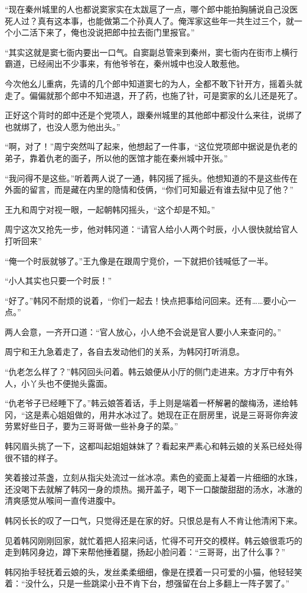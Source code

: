 “现在秦州城里的人也都说窦家实在太跋扈了一点，哪个郎中能拍胸脯说自己没医死人过？真有这本事，也能做第二个孙真人了。俺浑家这些年一共生过三个，就一个小二活下来了，俺也没说把郎中拉去衙门里报官。”

“其实这就是窦七衙内要出一口气。自窦副总管来到秦州，窦七衙内在街市上横行霸道，已经闹出不少事来，有他爷爷在，秦州城中也没人敢惹他。

今次他幺儿重病，先请的几个郎中知道窦七的为人，全都不敢下针开方，摇着头就走了。偏偏就那个郎中不知进退，开了药，也施了针，可是窦家的幺儿还是死了。

正好这个背时的郎中还是个党项人，跟秦州城里的其他郎中都没什么来往，说绑了也就绑了，也没人愿为他出头。”

“啊，对了！”周宁突然叫了起来，他想起了一件事，“这位党项郎中据说是仇老的弟子，靠着仇老的面子，所以他的医馆才能在秦州城中开张。”

“我问得不是这些。”听着两人说了一通，韩冈摇了摇头。他想知道的不是这些传在外面的留言，而是藏在内里的隐情和伎俩，“你们可知最近有谁去狱中见了他？”

王九和周宁对视一眼，一起朝韩冈摇头，“这个却是不知。”

周宁这次又抢先一步，他对韩冈道：“请官人给小人两个时辰，小人很快就给官人打听回来”

“俺一个时辰就够了。”王九像是在跟周宁竞价，一下就把价钱喊低了一半。

“小人其实也只要一个时辰！”

“好了。”韩冈不耐烦的说着，“你们一起去！快点把事给问回来。还有……要小心一点。”

两人会意，一齐开口道：“官人放心，小人绝不会说是官人要小人来查问的。”

周宁和王九急着走了，各自去发动他们的关系，为韩冈打听消息。

“仇老怎么样了？”韩冈回头问着。韩云娘便从小厅的侧门走进来。方才厅中有外人，小丫头也不便抛头露面。

“仇老爷子已经睡下了。”韩云娘答着话，手上则是端着一杯解暑的酸梅汤，递给韩冈，“这是素心姐姐做的，用井水冰过了。她现在正在厨房里，说是三哥哥你奔波劳累好些日子，要为三哥哥做一些补身子的菜。”

韩冈眉头挑了一下，这都叫起姐姐妹妹了？看起来严素心和韩云娘的关系已经处得很不错的样子。

笑着接过茶盏，立刻从指尖处流过一丝冰凉。素色的瓷面上凝着一片细细的水珠，还没喝下去就解了韩冈一身的烦热。揭开盖子，喝下一口酸酸甜甜的汤水，冰澈的清爽感觉从喉间一直传进腹中。

韩冈长长的叹了一口气，只觉得还是在家的好。只恨总是有人不肯让他清闲下来。

见着韩冈刚刚回家，就忙着把人招来问话，忙得不可开交的模样。韩云娘很乖巧的走到韩冈身边，蹲下来帮他捶着腿，扬起小脸问着：“三哥哥，出了什么事？”

韩冈抬手轻抚着云娘的头，发丝柔柔细细，像是在摸着一只可爱的小猫，他轻轻笑着：“没什么，只是一些跳梁小丑不肯下台，想强留在台上多翻上一阵子罢了。”

